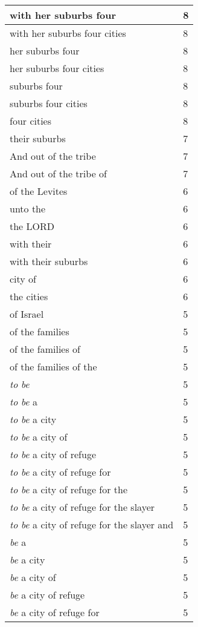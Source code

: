 \begin{center}
\begin{longtable}{|p{3.0in}|p{0.5in}|}
with her suburbs four & 8\\ \hline 
with her suburbs four cities & 8\\ \hline 
her suburbs four & 8\\ \hline 
her suburbs four cities & 8\\ \hline 
suburbs four & 8\\ \hline 
suburbs four cities & 8\\ \hline 
four cities & 8\\ \hline 
their suburbs & 7\\ \hline 
And out of the tribe & 7\\ \hline 
And out of the tribe of & 7\\ \hline 
of the Levites & 6\\ \hline 
unto the & 6\\ \hline 
the LORD & 6\\ \hline 
with their & 6\\ \hline 
with their suburbs & 6\\ \hline 
city of & 6\\ \hline 
the cities & 6\\ \hline 
of Israel & 5\\ \hline 
of the families & 5\\ \hline 
of the families of & 5\\ \hline 
of the families of the & 5\\ \hline 
\emph{to} \emph{be} & 5\\ \hline 
\emph{to} \emph{be} a & 5\\ \hline 
\emph{to} \emph{be} a city & 5\\ \hline 
\emph{to} \emph{be} a city of & 5\\ \hline 
\emph{to} \emph{be} a city of refuge & 5\\ \hline 
\emph{to} \emph{be} a city of refuge for & 5\\ \hline 
\emph{to} \emph{be} a city of refuge for the & 5\\ \hline 
\emph{to} \emph{be} a city of refuge for the slayer & 5\\ \hline 
\emph{to} \emph{be} a city of refuge for the slayer and & 5\\ \hline 
\emph{be} a & 5\\ \hline 
\emph{be} a city & 5\\ \hline 
\emph{be} a city of & 5\\ \hline 
\emph{be} a city of refuge & 5\\ \hline 
\emph{be} a city of refuge for & 5\\ \hline 

\end{longtable}
\end{center}

